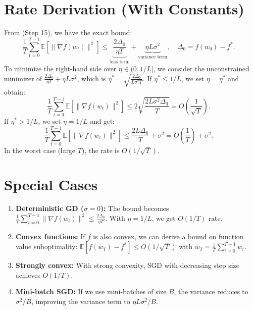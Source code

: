 \documentclass{article}
\begin{document}
\section*{Rate Derivation (With Constants)}
From (Step 15), we have the exact bound:
\begin{equation}
    \frac{1}{T} \sum_{t=0}^{T-1} \mathbb{E}[\|\nabla f(w_t)\|^2] \leq \underbrace{\frac{2\Delta_0}{\eta T}}_{\text{bias term}} + \underbrace{\eta L \sigma^2}_{\text{variance term}}, \quad \Delta_0 = f(w_0) - f^*.
\end{equation}
To minimize the right-hand side over $\eta \in (0, 1/L]$, we consider the unconstrained minimizer of $\frac{2\Delta_0}{\eta T} + \eta L \sigma^2$, which is $\eta^* = \sqrt{\frac{2\Delta_0}{L\sigma^2 T}}$. If $\eta^* \leq 1/L$, we set $\eta = \eta^*$ and obtain:
\begin{equation}
    \frac{1}{T} \sum_{t=0}^{T-1} \mathbb{E}[\|\nabla f(w_t)\|^2] \leq 2 \sqrt{\frac{2 L \sigma^2 \Delta_0}{T}} = O\left(\frac{1}{\sqrt{T}}\right).
\end{equation}
If $\eta^* > 1/L$, we set $\eta = 1/L$ and get:
\begin{equation}
    \frac{1}{T} \sum_{t=0}^{T-1} \mathbb{E}[\|\nabla f(w_t)\|^2] \leq \frac{2 L \Delta_0}{T} + \sigma^2 = O\left(\frac{1}{T}\right) + \sigma^2.
\end{equation}
In the worst case (large $T$), the rate is $O(1/\sqrt{T})$.

\section*{Special Cases}
\begin{enumerate}
    \item \textbf{Deterministic GD ($\sigma = 0$):} The bound becomes $\frac{1}{T}\sum_{t=0}^{T-1} \|\nabla f(w_t)\|^2 \leq \frac{2\Delta_0}{\eta T}$. With $\eta = 1/L$, we get $O(1/T)$ rate.
    \item \textbf{Convex functions:} If $f$ is also convex, we can derive a bound on function value suboptimality: $\mathbb{E}[f(\bar{w}_T) - f^*] \leq O(1/\sqrt{T})$ with $\bar{w}_T = \frac{1}{T}\sum_{t=0}^{T-1} w_t$.
    \item \textbf{Strongly convex:} With strong convexity, SGD with decreasing step size achieves $O(1/T)$.
    \item \textbf{Mini-batch SGD:} If we use mini-batches of size $B$, the variance reduces to $\sigma^2/B$, improving the variance term to $\eta L \sigma^2 / B$.
\end{enumerate}
\end{document}
